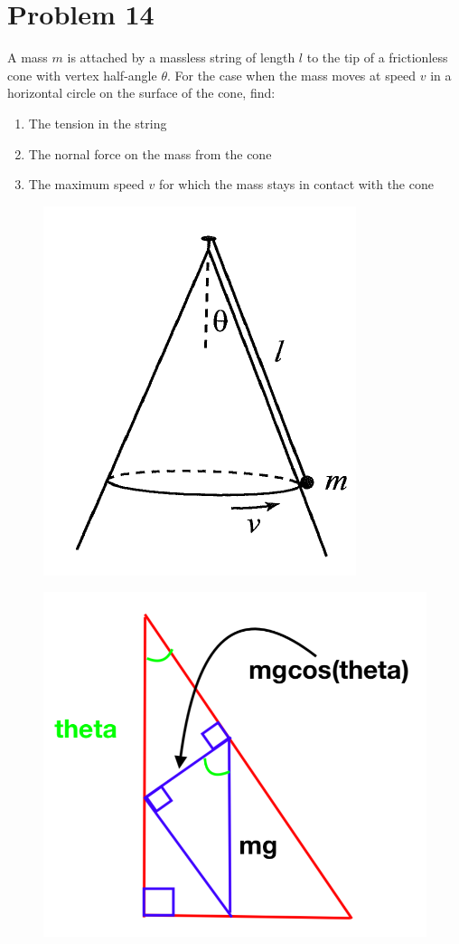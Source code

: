 \documentclass{article}
\begin{document}
\section*{Problem 14} 
A mass $m$ is attached by a massless string of length $l$ to the tip of a frictionless cone with vertex half-angle $\theta$. For the case when the mass moves at speed $v$ in a horizontal circle on the surface of the cone, find:
\begin{enumerate}[label=\alph*)]
	\item %
	The tension in the string
	\item %
	The nornal force on the mass from the cone
	\item %
	The maximum speed $v$ for which the mass stays in contact with the cone
\end{enumerate}
\begin{figure}[h]
	\includegraphics[scale=0.30]{P14_setup}
	\centering
\end{figure}
\begin{figure}[h]
	\includegraphics[scale=0.30]{P14_coords}
	\centering
\end{figure}
\end{document}
